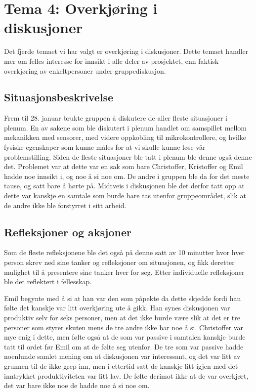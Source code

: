 \chapter{Tema 4: Overkjøring i\\diskusjoner}
Det fjerde temaet vi har valgt er overkjøring i diskusjoner.
Dette temaet handler mer om felles interesse for innsikt i alle deler av
prosjektet, enn faktisk overkjøring av enkeltpersoner under gruppediskusjon.

\section {Situasjonsbeskrivelse}
Frem til 28. januar brukte gruppen å diskutere de aller fleste situasjoner i plenum. En av sakene som ble diskutert i plenum handlet om samspillet mellom mekanikken med sensorer, med videre oppkobling til mikrokontrollere, og hvilke fysiske egenskaper som kunne måles for at vi skulle kunne løse vår problemstilling. Siden de fleste situasjoner ble tatt i plenum ble denne også denne det. Problemet var at dette var en sak som bare Christoffer, Kristoffer og Emil hadde noe innsikt i, og noe å si noe om. De andre i gruppen ble da for det meste tause, og satt bare å hørte på. Midtveis i diskusjonen ble det derfor tatt opp at dette var kanskje en samtale som burde bare tas utenfor gruppeområdet, slik at de andre ikke ble forstyrret i sitt arbeid.

\section{Refleksjoner og aksjoner}
Som de fleste refleksjonene ble det også på denne satt av 10 minutter hvor hver person skrev ned sine tanker og refleksjoner om situasjonen, og fikk deretter mulighet til å presentere sine tanker hver for seg. Etter individuelle refleksjoner ble det reflektert i fellesskap.

Emil begynte med å si at han var den som påpekte da dette skjedde fordi han følte det kanskje var litt overkjøring ute å gikk. Han synes diskusjonen var produktiv selv for seks personer, men at det ikke burde være slik at det er tre personer som styrer skuten mens de tre andre ikke har noe å si. Christoffer var mye enig i dette, men følte også at de som var passive i samtalen kanskje burde tatt til ordet før Emil om at de følte seg utenfor. De tre som var passive hadde noenlunde samlet mening om at diskusjonen var interessant, og det var litt av grunnen til de ikke grep inn, men i ettertid satt de kanskje litt igjen med det inntrykket produktiviteten var litt lav. De følte derimot ikke at de var overkjørt, det var bare ikke noe de hadde noe å si noe om.

